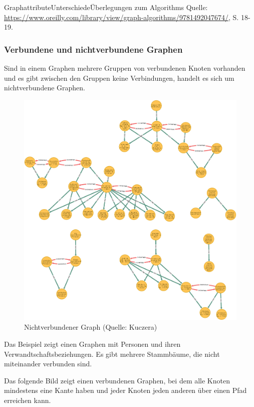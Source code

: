 \textbar Graphattribute\textbar Unterschiede\textbar Überlegungen zum
Algorithms\textbar{} Quelle:
\href{Needham/Hodler\%202019}{https://www.oreilly.com/library/view/graph-algorithms/9781492047674/},
S. 18-19.

\hypertarget{verbundene-und-nichtverbundene-graphen}{%
\subsubsection{Verbundene und nichtverbundene
Graphen}\label{verbundene-und-nichtverbundene-graphen}}

Sind in einem Graphen mehrere Gruppen von verbundenen Knoten vorhanden
und es gibt zwischen den Gruppen keine Verbindungen, handelt es sich um
nichtverbundene Graphen.

\begin{figure}
\centering
\includegraphics{Bilder/disconnectedGraph.png}
\caption{Nichtverbundener Graph (Quelle: Kuczera)}
\end{figure}

Das Beispiel zeigt einen Graphen mit Personen und ihren
Verwandtschaftsbeziehungen. Es gibt mehrere Stammbäume, die nicht
miteinander verbunden sind.

Das folgende Bild zeigt einen verbundenen Graphen, bei dem alle Knoten
mindestens eine Kante haben und jeder Knoten jeden anderen über einen
Pfad erreichen kann.

